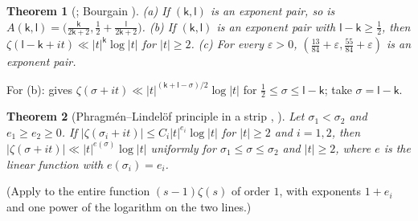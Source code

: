 \documentclass[preprint,12pt]{elsarticle}
\numberwithin{equation}{section}
\theoremstyle{plain}
\newtheorem{theorem}{Theorem}[section]
\theoremstyle{definition}
\theoremstyle{remark}
\begin{document}
\begin{theorem}[{\cite[Lemma~2.8 and (7.57)]{Ivic1985}}; Bourgain {\cite[\S5, Thm.~6]{Bourgain2017}}]\label{thm:known_exponents}
(a) If $(\mathsf k,\mathsf l)$ is an exponent pair, so is $A(\mathsf k,\mathsf l)=\bigl(\frac{\mathsf k}{2\mathsf k+2},\frac12+\frac{\mathsf l}{2\mathsf k+2}\bigr)$. (b) If $(\mathsf k,\mathsf l)$ is an exponent pair with $\mathsf l-\mathsf k\ge\frac12$, then $\zeta(\mathsf l-\mathsf k+it)\ll|t|^{\mathsf k}\log|t|$ for $|t|\ge2$. (c) For every $\varepsilon>0$, $(\frac{13}{84}+\varepsilon,\frac{55}{84}+\varepsilon)$ is an exponent pair.
\end{theorem}
For (b): \cite[(7.57)]{Ivic1985} gives $\zeta(\sigma+it)\ll|t|^{(\mathsf k+\mathsf l-\sigma)/2}\log|t|$ for $\frac12\le\sigma\le\mathsf l-\mathsf k$; take $\sigma=\mathsf l-\mathsf k$.

\begin{theorem}[Phragm\'en--Lindel\"of principle in a strip {\cite[Lemma~2.5]{BellottiWong2025}}, {\cite[Lemma~3]{Trudgian2014}}]\label{thm:known_PL}
Let $\sigma_1<\sigma_2$ and $e_1\ge e_2\ge0$. If $|\zeta(\sigma_i+it)|\le C_i|t|^{e_i}\log|t|$ for $|t|\ge2$ and $i=1,2$, then $|\zeta(\sigma+it)|\ll|t|^{e(\sigma)}\log|t|$ uniformly for $\sigma_1\le\sigma\le\sigma_2$ and $|t|\ge2$, where $e$ is the linear function with $e(\sigma_i)=e_i$.
\end{theorem}
(Apply \cite[Lemma~2.5]{BellottiWong2025} to the entire function $(s-1)\zeta(s)$ of order $1$, with exponents $1+e_i$ and one power of the logarithm on the two lines.)
\end{document}
